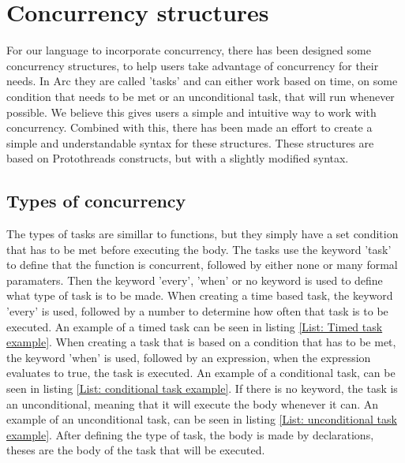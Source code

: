 
\section{Concurrency structures}\label{sec:Concurrency structures}
For our language to incorporate concurrency, there has been designed some concurrency structures, to help users take advantage of concurrency for their needs. In Arc they are called 'tasks' and can either work based on time, on some condition that needs to be met or an unconditional task, that will run whenever possible. We believe this gives users a simple and intuitive way to work with concurrency. Combined with this, there has been made an effort to create a simple and understandable syntax for these structures. These structures are based on Protothreads constructs, but with a slightly modified syntax. 

\subsection{Types of concurrency}
The types of tasks are simillar to functions, but they simply have a set condition that has to be met before executing the body. The tasks use the keyword 'task' to define that the function is concurrent, followed by either none or many formal paramaters. Then the keyword 'every', 'when' or no keyword is used to define what type of task is to be made. When creating a time based task, the keyword 'every' is used, followed by a number to determine how often that task is to be executed. An example of a timed task can be seen in listing \ref*{List: Timed task example}. When creating a task that is based on a condition that has to be met, the keyword 'when' is used, followed by an expression, when the expression evaluates to true, the task is executed. An example of a conditional task, can be seen in listing \ref*{List: conditional task example}. If there is no keyword, the task is an unconditional, meaning that it will execute the body whenever it can. An example of an unconditional task, can be seen in listing \ref*{List: unconditional task example}. After defining the type of task, the body is made by declarations, theses are the body of the task that will be executed.

